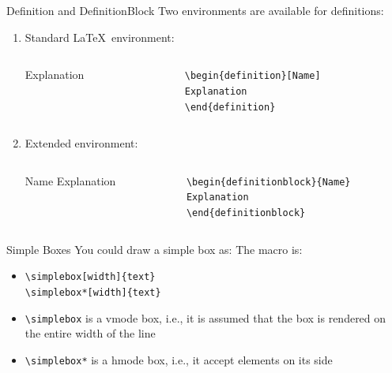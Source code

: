 \documentclass[english,sectioncirclenumberstyle]{ciadbeamer}
\begin{document}
\begin{frame}{Definition and DefinitionBlock}
	Two environments are available for definitions:
	\begin{enumerate}
	\item Standard \LaTeX\ environment:
		\begin{columns}
			\begin{column}{.5\linewidth}
				\begin{definition}[Name]
					Explanation
				\end{definition}
			\end{column}
			\begin{column}{.5\linewidth}
				\texttt{{\textbackslash}begin\{definition\}[Name]} \\
				\texttt{Explanation} \\
				\texttt{{\textbackslash}end\{definition\}}
			\end{column}
		\end{columns}
		\vspace{1cm}
	\item Extended environment:
		\begin{columns}
			\begin{column}{.5\linewidth}
				\begin{definitionblock}{Name}
					Explanation
				\end{definitionblock}
			\end{column}
			\begin{column}{.5\linewidth}
				\texttt{{\textbackslash}begin\{definitionblock\}\{Name\}} \\
				\texttt{Explanation} \\
				\texttt{{\textbackslash}end\{definitionblock\}}
			\end{column}
		\end{columns}
	\end{enumerate}
\end{frame}

\begin{frame}{Simple Boxes}
	You could draw a simple box as:
	The macro is:	
	\begin{itemize}
	\item \texttt{{\textbackslash}simplebox[width]\{text\}} \\
		\texttt{{\textbackslash}simplebox*[width]\{text\}} \\[.5cm]
	\item \texttt{{\textbackslash}simplebox} is a vmode box, i.e., it is assumed that the box is rendered on the entire width of the line
	\item \texttt{{\textbackslash}simplebox*} is a hmode box, i.e., it accept elements on its side
	\end{itemize}
\end{frame}
\end{document}
